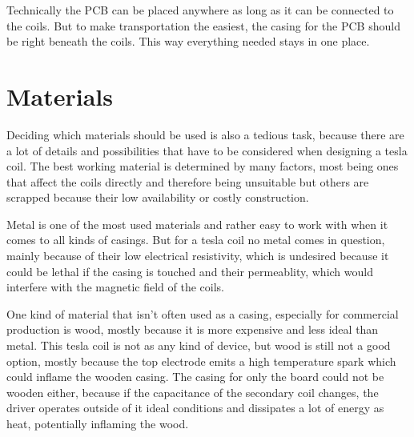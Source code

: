 Technically the PCB can be placed anywhere as long as it can be connected to the coils. But to make transportation the easiest, the casing for the PCB should be right beneath the coils. This way everything needed stays in one place. 

\section{Materials}

Deciding which materials should be used is also a tedious task, because there are a lot of details and possibilities that have to be considered when designing a tesla coil. The best working material is determined by many factors, most being ones that affect the coils directly and therefore being unsuitable but others are scrapped because their low availability or costly construction.

Metal is one of the most used materials and rather easy to work with when it comes to all kinds of casings. But for a tesla coil no metal comes in question, mainly because of their low electrical resistivity, which is undesired because it could be lethal if the casing is touched and their permeablity, which would interfere with the magnetic field of the coils. 

One kind of material that isn't often used as a casing, especially for commercial production is wood, mostly because it is more expensive and less ideal than metal. This tesla coil is not as any kind of device, but wood is still not a good option, mostly because the top electrode emits a high temperature spark which could inflame the wooden casing. The casing for only the board could not be wooden either, because if the capacitance of the secondary coil changes, the driver operates outside of it ideal conditions and dissipates a lot of energy as heat, potentially inflaming the wood.



